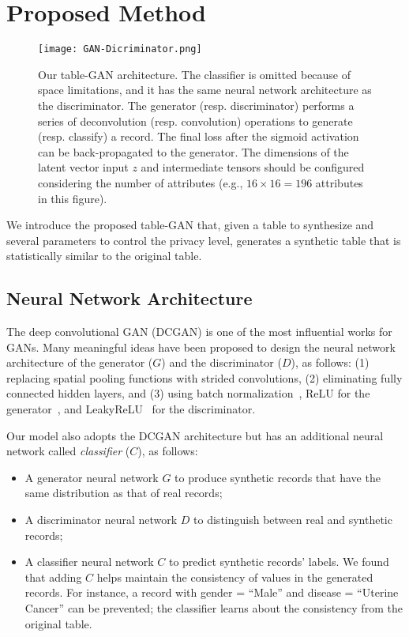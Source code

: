 \section{Proposed Method}\label{sec:approach}

\begin{figure*}[t]
\centering
\texttt{[image: GAN-Dicriminator.png]}
\vspace{-1em}
\caption{Our table-GAN architecture. The classifier is omitted because of space limitations, and it has the same neural network architecture as the discriminator. The generator (resp. discriminator) performs a series of deconvolution (resp. convolution) operations to generate (resp. classify) a record. The final loss after the sigmoid activation can be back-propagated to the generator. The dimensions of the latent vector input $z$ and intermediate tensors should be configured considering the number of attributes (e.g., $16 \times 16=196$ attributes in this figure).}
  \label{fig:gdlayers}
\end{figure*}

We introduce the proposed table-GAN that, given a table to synthesize and several parameters to control the privacy level, generates a synthetic table that is statistically similar to the original table.


\subsection{Neural Network Architecture}
The deep convolutional GAN (DCGAN) is one of the most influential works for GANs. Many meaningful ideas have been proposed to design the neural network architecture of the generator ($G$) and the discriminator ($D$), as follows: (1) replacing spatial pooling functions with strided convolutions, (2) eliminating fully connected hidden layers, and (3) using batch normalization~\cite{conf/icml/IoffeS15}, ReLU for the generator~\cite{icml2010_NairH10}, and LeakyReLU~\cite{maas2013rectifier} for the discriminator.

Our model also adopts the DCGAN architecture but has an additional neural network called \textit{classifier} ($C$), as follows:
\begin{itemize}
\item A generator neural network $G$ to produce synthetic records that have the same distribution as that of real records;
\item A discriminator neural network $D$ to distinguish between real and synthetic records;
\item A classifier neural network $C$ to predict synthetic records' labels. We found that adding $C$ helps maintain the consistency of values in the generated records. For instance, a record with gender = ``Male'' and disease = ``Uterine Cancer''  can be prevented; the classifier learns about the consistency from the original table.
\end{itemize}

